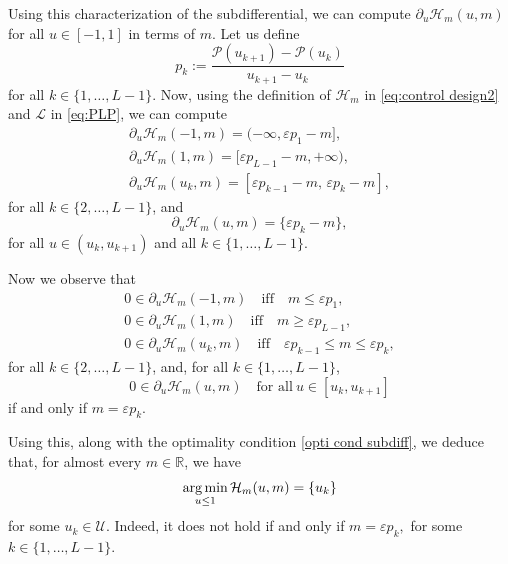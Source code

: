 \documentclass[twocolumn]{autart}    %
\begin{document}
Using this characterization of the subdifferential, we can compute $\partial_u\mathcal{H}_m(u,m)$ for all $u\in [-1,1]$ in terms of $m$.
Let us define
$$
p_k := \dfrac{\mathcal{P}(u_{k+1}) - \mathcal{P} (u_k) }{u_{k+1} - u_k} 
$$
for all $k\in \{1, \ldots, L-1\}$.
Now,  using the definition of $\mathcal{H}_m$ in \eqref{eq:control design2} and $\mathcal{L}$ in \eqref{eq:PLP}, we can compute
\begin{equation*}
\begin{array}{l}
\partial_u \mathcal{H}_m (-1, m) = (-\infty, \varepsilon p_1 -m], \\
\partial_u \mathcal{H}_m (1, m) = [\varepsilon p_{L-1} -m, +\infty), \\
\partial_u \mathcal{H}_m (u_k, m) = [\varepsilon p_{k-1} -m,  \, \varepsilon p_k -m ],
\end{array}
\end{equation*}
for all $k\in \{ 2, \ldots, L-1\}$,  and
\begin{equation*}
\partial_u \mathcal{H}_m (u, m) = \{\varepsilon p_k -m\},
\end{equation*}
for all $u\in (u_k, u_{k+1})$ and all $k\in \{ 1, \ldots, L-1 \}$.

Now we observe that
\begin{equation}\label{eq:subdiff}
\begin{array}{l}
0\in \partial_u \mathcal{H}_m (-1, m) \quad \text{iff}\quad  m\leq  \varepsilon p_1, \\
0\in \partial_u \mathcal{H}_m (1, m) \quad \text{iff} \quad m\geq  \varepsilon p_{L-1}, \\
0\in \partial_u \mathcal{H}_m (u_k, m) \quad \text{iff} \quad  \varepsilon p_{k-1} \leq   m \leq \varepsilon p_k ,
\end{array}
\end{equation}
for all $k\in \{ 2, \ldots, L-1\}$,  and, for all $k\in \{ 1, \ldots, L-1 \}$,
\begin{equation*}
0\in \partial_u \mathcal{H}_m (u, m) \quad \text{for all}\  u\in [u_k, u_{k+1}]
\end{equation*}
if and only if $m= \varepsilon p_k$.

Using this, along with the optimality condition \eqref{opti cond subdiff}, we deduce that, for almost every $m\in \mathbb{R}$, we have
$$
\operatorname*{arg\,min}_{u\leq 1} \mathcal{H}_m (u,m) = \{ u_k\}
$$
for some $u_k\in \mathcal{U}$.
Indeed, it does not hold if and only if
$m= \varepsilon p_k,$
for some $k\in \{1,\ldots, L-1\}$.
\end{document}
